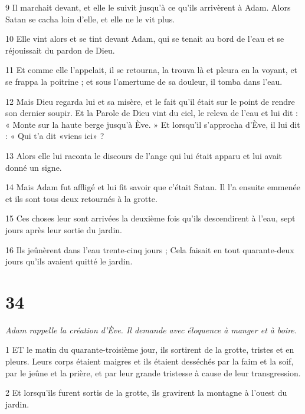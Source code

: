 \par 9 Il marchait devant, et elle le suivit jusqu'à ce qu'ils arrivèrent à Adam. Alors Satan se cacha loin d'elle, et elle ne le vit plus.

\par 10 Elle vint alors et se tint devant Adam, qui se tenait au bord de l'eau et se réjouissait du pardon de Dieu.

\par 11 Et comme elle l'appelait, il se retourna, la trouva là et pleura en la voyant, et se frappa la poitrine ; et sous l'amertume de sa douleur, il tomba dans l'eau.

\par 12 Mais Dieu regarda lui et sa misère, et le fait qu'il était sur le point de rendre son dernier soupir. Et la Parole de Dieu vint du ciel, le releva de l'eau et lui dit : « Monte sur la haute berge jusqu'à Ève. » Et lorsqu'il s'approcha d'Ève, il lui dit : « Qui t'a dit «viens ici» ?

\par 13 Alors elle lui raconta le discours de l'ange qui lui était apparu et lui avait donné un signe.

\par 14 Mais Adam fut affligé et lui fit savoir que c'était Satan. Il l'a ensuite emmenée et ils sont tous deux retournés à la grotte.

\par 15 Ces choses leur sont arrivées la deuxième fois qu'ils descendirent à l'eau, sept jours après leur sortie du jardin.

\par 16 Ils jeûnèrent dans l'eau trente-cinq jours ; Cela faisait en tout quarante-deux jours qu'ils avaient quitté le jardin.

\chapter{34}

\par \textit{Adam rappelle la création d'Ève. Il demande avec éloquence à manger et à boire.}

\par 1 ET le matin du quarante-troisième jour, ils sortirent de la grotte, tristes et en pleurs. Leurs corps étaient maigres et ils étaient desséchés par la faim et la soif, par le jeûne et la prière, et par leur grande tristesse à cause de leur transgression.

\par 2 Et lorsqu'ils furent sortis de la grotte, ils gravirent la montagne à l'ouest du jardin.

